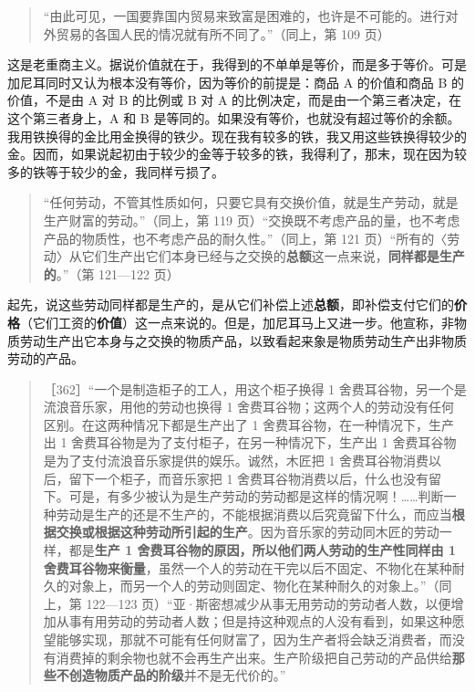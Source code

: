 \begin{quote}“由此可见，一国要靠国内贸易来致富是困难的，也许是不可能的。进行对外贸易的各国人民的情况就有所不同了。”（同上，第 109 页）\end{quote}

这是老重商主义。据说价值就在于，我得到的不单单是等价，而是多于等价。可是加尼耳同时又认为根本没有等价，因为等价的前提是：商品 A 的价值和商品 B 的价值，不是由 A 对 B 的比例或 B 对 A 的比例决定，而是由一个第三者决定，在这个第三者身上，A 和 B 是等同的。如果没有等价，也就没有超过等价的余额。我用铁换得的金比用金换得的铁少。现在我有较多的铁，我又用这些铁换得较少的金。因而，如果说起初由于较少的金等于较多的铁，我得利了，那末，现在因为较多的铁等于较少的金，我同样亏损了。


\begin{quote}“任何劳动，不管其性质如何，只要它具有交换价值，就是生产劳动，就是生产财富的劳动。”（同上，第 119 页）“交换既不考虑产品的量，也不考虑产品的物质性，也不考虑产品的耐久性。”（同上，第 121 页）“所有的〈劳动〉从它们生产出它们本身已经与之交换的\textbf{总额}这一点来说，\textbf{同样都是生产的}。”（第 121—122 页）\end{quote}

起先，说这些劳动同样都是生产的，是从它们补偿上述\textbf{总额}，即补偿支付它们的\textbf{价格}（它们工资的\textbf{价值}）这一点来说的。但是，加尼耳马上又进一步。他宣称，非物质劳动生产出它本身与之交换的物质产品，以致看起来象是物质劳动生产出非物质劳动的产品。

\begin{quote}［362］“一个是制造柜子的工人，用这个柜子换得 1 舍费耳谷物，另一个是流浪音乐家，用他的劳动也换得 1 舍费耳谷物；这两个人的劳动没有任何区别。在这两种情况下都是生产出了 1 舍费耳谷物，在一种情况下，生产出 1 舍费耳谷物是为了支付柜子，在另一种情况下，生产出 1 舍费耳谷物是为了支付流浪音乐家提供的娱乐。诚然，木匠把 1 舍费耳谷物消费以后，留下一个柜子，而音乐家把 1 舍费耳谷物消费以后，什么也没有留下。可是，有多少被认为是生产劳动的劳动都是这样的情况啊！……判断一种劳动是生产的还是不生产的，不能根据消费以后究竟留下什么，而应当\textbf{根据交换或根据这种劳动所引起的生产}。因为音乐家的劳动同木匠的劳动一样，都是\textbf{生产 1 舍费耳谷物的原因，所以他们两人劳动的生产性同样由 1 舍费耳谷物来衡量}，虽然一个人的劳动在干完以后不固定、不物化在某种耐久的对象上，而另一个人的劳动则固定、物化在某种耐久的对象上。”（同上，第 122—123 页）“亚·斯密想减少从事无用劳动的劳动者人数，以便增加从事有用劳动的劳动者人数；但是持这种观点的人没有看到，如果这种愿望能够实现，那就不可能有任何财富了，因为生产者将会缺乏消费者，而没有消费掉的剩余物也就不会再生产出来。生产阶级把自己劳动的产品供给\textbf{那些不创造物质产品的阶级}并不是无代价的。”\end{quote}

